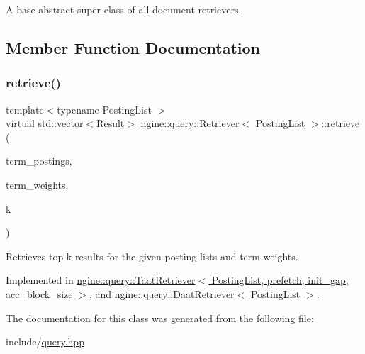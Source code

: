 A base abstract super-\/class of all document retrievers. 

\subsection{Member Function Documentation}
\mbox{\label{classngine_1_1query_1_1Retriever_ac5549667cbb5927ec4ead8b9ec8aece0}} 
\subsubsection{\texorpdfstring{retrieve()}{retrieve()}}
{\footnotesize\ttfamily template$<$typename Posting\+List $>$ \\
virtual std\+::vector$<$\hyperlink{structngine_1_1query_1_1Result}{Result}$>$ \hyperlink{classngine_1_1query_1_1Retriever}{ngine\+::query\+::\+Retriever}$<$ \hyperlink{classngine_1_1PostingList}{Posting\+List} $>$\+::retrieve (\begin{DoxyParamCaption}\item[{const std\+::vector$<$ \hyperlink{classngine_1_1PostingList}{Posting\+List} $>$ \&}]{term\+\_\+postings,  }\item[{const std\+::vector$<$ \hyperlink{structngine_1_1Score}{Score} $>$ \&}]{term\+\_\+weights,  }\item[{std\+::size\+\_\+t}]{k }\end{DoxyParamCaption})\hspace{0.3cm}{\ttfamily [pure virtual]}}



Retrieves top-\/k results for the given posting lists and term weights. 



Implemented in \hyperlink{classngine_1_1query_1_1TaatRetriever_a81d0ee715edbd1a105476e4bb7e7273d}{ngine\+::query\+::\+Taat\+Retriever$<$ Posting\+List, prefetch, init\+\_\+gap, acc\+\_\+block\+\_\+size $>$}, and \hyperlink{classngine_1_1query_1_1DaatRetriever_a348228b0d8d52b38fee84482aa5093e8}{ngine\+::query\+::\+Daat\+Retriever$<$ Posting\+List $>$}.



The documentation for this class was generated from the following file\+:\begin{DoxyCompactItemize}
\item 
include/\hyperlink{query_8hpp}{query.\+hpp}\end{DoxyCompactItemize}
